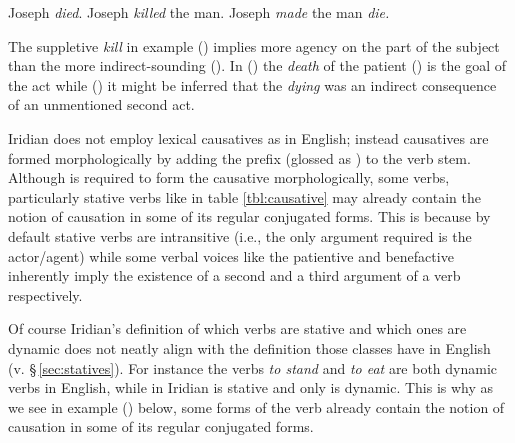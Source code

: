 \pex
\a Joseph \emph{died}.
\a Joseph \emph{killed} the man.
\a Joseph \emph{made} the man \emph{die.}
\xe

The suppletive \emph{kill} in example () implies more agency on the part of the subject than the more indirect-sounding (). In () the \emph{death} of the patient () is the goal of the act while () it might be inferred that the \emph{dying} was an indirect consequence of an unmentioned second act.


Iridian does not employ lexical causatives as in English; instead causatives are formed morphologically by adding the prefix  (glossed as \Caus{}) to the verb stem. Although  is required to form the causative morphologically, some verbs, particularly stative verbs like  in table \ref{tbl:causative} may already contain the notion of causation in some of its regular conjugated forms. This is because by default stative verbs are intransitive (i.e., the only argument required is the actor/agent) while some verbal voices like the patientive and benefactive inherently imply the existence of a second and a third argument of a verb respectively.


Of course Iridian's definition of which verbs are stative and which ones are dynamic does not neatly align with the definition those classes have in English (v. \S\,\ref{sec:statives}). For instance the verbs \emph{to stand} and \emph{to eat} are both dynamic verbs in English, while in Iridian  is stative and only  is dynamic. This is why as we see in example () below, some forms of the verb  already contain the notion of causation in some of its regular conjugated forms.

\pex
\a  {}\\
	\\
    \\
    \\
\a  {}\\
    \\
\xe


